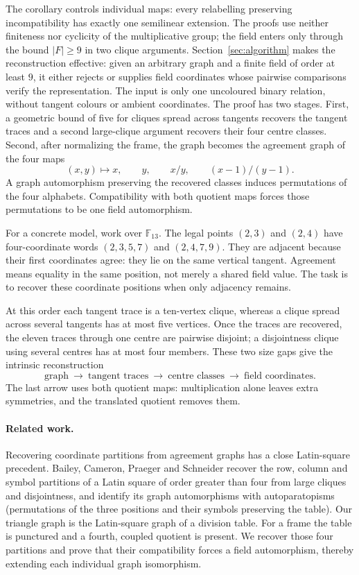 \documentclass[11pt]{article}
\theoremstyle{definition}
\theoremstyle{remark}
\newcommand{\F}{\mathbb F}
\begin{document}
The corollary controls individual maps: every relabelling preserving
incompatibility has exactly one semilinear extension. The proofs use
neither finiteness nor cyclicity of the multiplicative group; the field
enters only through the bound $|F|\ge9$ in two clique arguments.
Section~\ref{sec:algorithm} makes the reconstruction effective: given an
arbitrary graph and a finite field of order at least $9$, it either
rejects or supplies field
coordinates whose pairwise comparisons verify the representation.
The input is only one uncoloured binary relation, without tangent colours
or ambient coordinates. The proof has two stages. First, a geometric bound of five for cliques spread across tangents recovers
the tangent traces and a second large-clique argument recovers their four
centre classes.  Second, after normalizing the frame, the graph becomes the
agreement graph of the four maps
\[
  (x,y)\longmapsto x,\qquad y,\qquad x/y,\qquad
  (x-1)/(y-1).
\]
A graph automorphism preserving the recovered classes induces permutations
of the four alphabets.  Compatibility with both quotient maps forces those
permutations to be one field automorphism.

For a concrete model, work over $\F_{13}$. The legal points $(2,3)$ and
$(2,4)$ have four-coordinate words $(2,3,5,7)$ and $(2,4,7,9)$. They
are adjacent because their first coordinates agree: they lie on the same
vertical tangent. Agreement means equality in the same position, not merely
a shared field value. The task is to recover these coordinate positions
when only adjacency remains.

At this order each tangent trace is a ten-vertex clique, whereas a clique
spread across several tangents has at most five vertices. Once the traces
are recovered, the eleven traces through one centre are pairwise disjoint;
a disjointness clique using several centres has at most four members.
These two size gaps give the intrinsic reconstruction
\[
 \text{graph}\ \longrightarrow\ \text{tangent traces}
 \ \longrightarrow\ \text{centre classes}
 \ \longrightarrow\ \text{field coordinates}.
\]
The last arrow uses both quotient maps: multiplication alone leaves
extra symmetries, and the translated quotient removes them.

\paragraph{Related work.}

Recovering coordinate partitions from agreement graphs has a close
Latin-square precedent. Bailey, Cameron, Praeger and Schneider
\cite[Propositions 2.4 and 2.6]{BCPS} recover the row, column and symbol
partitions of a Latin square of order greater than four from large cliques
and disjointness, and identify its graph automorphisms with autoparatopisms
(permutations of the three positions and their symbols preserving the table).
Our triangle graph is the Latin-square graph of a division table. For a
frame the table is punctured and a fourth, coupled quotient is present.
We recover those four partitions and prove that their compatibility forces
a field automorphism, thereby extending each individual graph isomorphism.
\end{document}
